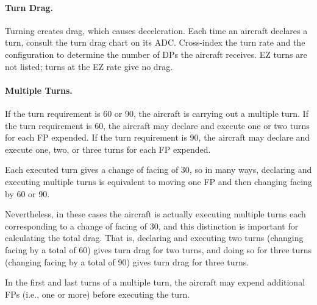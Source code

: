 {{}{

\paragraph{Turn Drag.} Turning creates drag, which causes deceleration. Each time an aircraft declares a turn, consult the turn drag chart on its ADC. Cross-index the turn rate and the configuration to determine the number of DPs the aircraft receives. EZ turns are not listed; turns at the EZ rate give no drag.


\paragraph{Multiple Turns.}
If the turn requirement is 60 or 90, the aircraft is carrying out a multiple turn. If the turn requirement is 60, the aircraft may declare and execute one or two turns for each FP expended. If the turn requirement is 90, the aircraft may declare and execute one, two, or three turns for each FP expended.

Each executed turn gives a change of facing of 30{\deg}, so in many ways, declaring and executing multiple turns is equivalent to moving one FP and then changing facing by 60{\deg} or 90{\deg}. 

Nevertheless, in these cases the aircraft is actually executing multiple turns each corresponding to a change of facing of 30{\deg}, and this distinction is important for calculating the total drag. That is, declaring and executing two turns (changing facing by a total of 60{\deg}) gives turn drag for two turns, and doing so for three turns (changing facing by a total of 90{\deg}) gives turn drag for three turns.

In the first and last turns of a multiple turn, the aircraft may expend additional FPs (i.e., one or more) before executing the turn.

}

}



